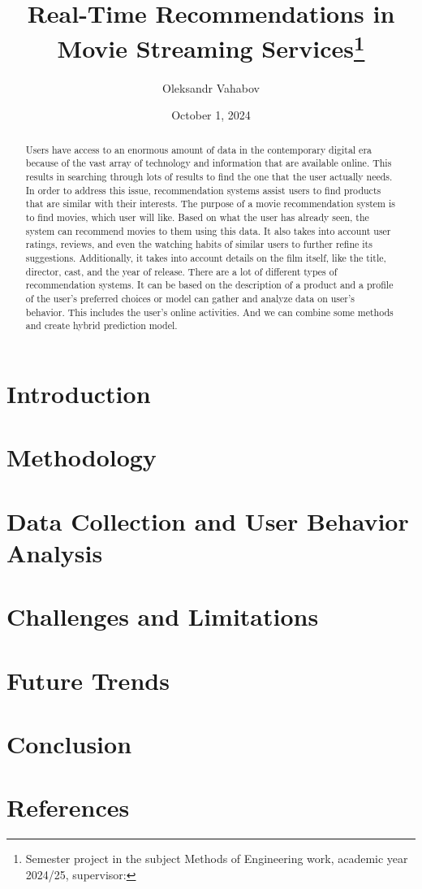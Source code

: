 \documentclass[10pt,twoside,slovak,a4paper]{article}
\title{Real-Time Recommendations in Movie Streaming Services\thanks{Semester project in the subject Methods of Engineering work, academic year 2024/25, supervisor: }}
\author{Oleksandr Vahabov\\[2pt]}
\date{\small October 1, 2024}
\begin{document}
\maketitle

\renewcommand{\abstractname}{\Large Abstract}
\begin{abstract}
\vspace{10pt}
\large

Users have access to an enormous amount of data in the contemporary digital era because of the vast array of technology and information that are available online. This results in searching through lots of results to find the one that the user actually needs. In order to address this issue, recommendation systems assist users to find products that are similar with their interests. The purpose of a movie recommendation system is to find movies, which user will like. Based on what the user has already seen, the system can recommend movies to them using this data. It also takes into account user ratings, reviews, and even the watching habits of similar users to further refine its suggestions. Additionally, it takes into account details on the film itself, like the title, director, cast, and the year of release. There are a lot of different types of recommendation systems. It can be based on the description of a product and a profile of the user’s preferred choices or model can gather and analyze data on user’s behavior. This includes the user’s online activities. And we can combine some methods and create hybrid prediction model.\citep{10389982}
\end{abstract}

\newpage
\renewcommand{\contentsname}{Contents}
\setcounter{tocdepth}{1}

\tableofcontents 

\newpage
\section{Introduction}
\section{Methodology}
\section{Data Collection and User Behavior Analysis} 
\section{Challenges and Limitations}
\section{Future Trends}
\section{Conclusion}
\section{References}
\newpage

\renewcommand{\refname}{References}

 
\end{document}
